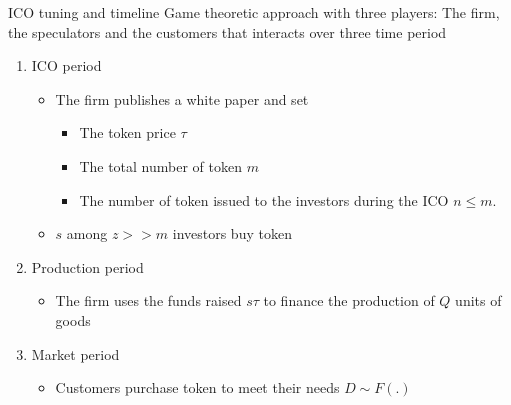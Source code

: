 \documentclass{beamer}
\begin{document}
\begin{frame}{ICO tuning and timeline}
\scriptsize
Game theoretic approach with three players: The firm, the speculators
and the customers that interacts over three time period
\begin{enumerate}
  \item ICO period
  \begin{itemize}
    \item \tiny The firm publishes a white paper and set 
    \begin{itemize}
    \item \tiny The token price $\tau$
    \item \tiny The total number of token $m$
    \item \tiny The number of token issued to the investors during the ICO $n\leq m$.
  \end{itemize}
    \item \tiny $s$ among $z>>m$ investors buy token
  \end{itemize}
  \item Production period
  \begin{itemize}
    \item \tiny The firm uses the funds raised $s\tau$ to finance the production of $Q$ units of goods
  \end{itemize}
\item Market period
  \begin{itemize}
    \item \tiny Customers purchase token to meet their needs $D\sim F(.)$
  \end{itemize}
\end{enumerate}
\vspace{0.2cm}
\centering
{}
\end{frame}
\end{document}
